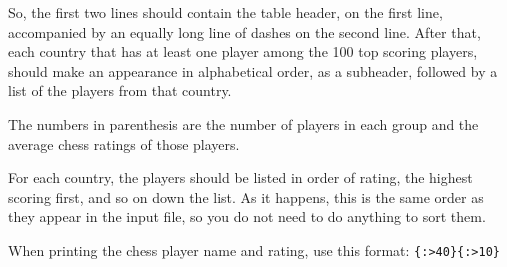 So, the first two lines should contain the table header, on the first line,
accompanied by an equally long line of dashes on the second line.
After that, each country that has at least one player among the 100 top scoring players,
should make an appearance in alphabetical order,
as a subheader,
followed by a list of the players from that country.

The numbers in parenthesis are
the number of players in each group and
the average chess ratings of those players.

For each country, the players should be listed in order of rating,
the highest scoring first, and so on down the list.
As it happens, this is the same order as they appear in the input file,
so you do not need to do anything to sort them.

When printing the chess player name and rating, use this format:
\texttt{\{:>40\}\{:>10\}}
